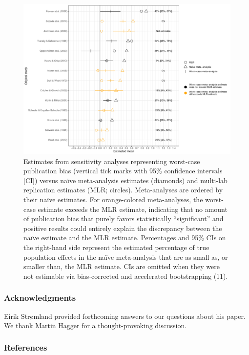 \documentclass[12pt]{article}
\begin{document}
\begin{figure}[h!]
\centering
     \includegraphics[width=7in]{../results/analysis_2/forest.pdf}
      \caption{Estimates from sensitivity analyses representing worst-case publication bias (vertical tick marks with 95\% confidence intervals [CI]) versus naïve meta-analysis estimates (diamonds) and multi-lab replication estimates (MLR; circles). Meta-analyses are ordered by their naïve estimates. For orange-colored meta-analyses, the worst-case estimate exceeds the MLR estimate, indicating that no amount of publication bias that purely favors statistically “significant” and positive results could entirely explain the discrepancy between the naïve estimate and the MLR estimate. Percentages and 95\% CIs on the right-hand side represent the estimated percentage of true population effects in the naïve meta-analysis that are as small as, or smaller than, the MLR estimate. CIs are omitted when they were not estimable via bias-corrected and accelerated bootstrapping (11).}
\end{figure}
\pagebreak

\subsubsection*{Acknowledgments}
Eirik Strømland provided forthcoming answers to our questions about his paper. We thank Martin Hagger for a thought-provoking discussion. 	

\subsubsection*{References}
\end{document}
